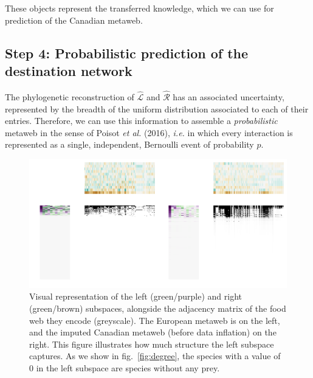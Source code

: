 \documentclass[11pt]{article}
\makeatletter
\def\maxwidth{\ifdim\Gin@nat@width>\linewidth\linewidth
\else\Gin@nat@width\fi}
\let\Oldincludegraphics\includegraphics
\renewcommand{\includegraphics}[1]{\Oldincludegraphics[width=\maxwidth]{#1}}
\providecommand{\DIFaddbeginFL}{} %
\providecommand{\DIFaddendFL}{} %
\providecommand{\DIFdelbeginFL}{} %
\providecommand{\DIFdelendFL}{} %
\newcommand{\DIFscaledelfig}{0.5}
\newlength{\DIFdelgraphicswidth} %
\newlength{\DIFdelgraphicsheight} %
\newcommand{\DIFaddincludegraphics}[2][]{{\color{blue}\fbox{\DIFOincludegraphics[#1]{#2}}}} %
\newcommand{\DIFdelincludegraphics}[2][]{%
\sbox{\DIFdelgraphicsbox}{\DIFOincludegraphics[#1]{#2}}%
\settoboxwidth{\DIFdelgraphicswidth}{\DIFdelgraphicsbox} %
\settoboxtotalheight{\DIFdelgraphicsheight}{\DIFdelgraphicsbox} %
\scalebox{\DIFscaledelfig}{%
\parbox[b]{\DIFdelgraphicswidth}{\usebox{\DIFdelgraphicsbox}\\[-\baselineskip] \rule{\DIFdelgraphicswidth}{0em}}\llap{\resizebox{\DIFdelgraphicswidth}{\DIFdelgraphicsheight}{%
\setlength{\unitlength}{\DIFdelgraphicswidth}%
\begin{picture}(1,1)%
\thicklines\linethickness{2pt} %
{\color[rgb]{1,0,0}\put(0,0){\framebox(1,1){}}}%
{\color[rgb]{1,0,0}\put(0,0){\line( 1,1){1}}}%
{\color[rgb]{1,0,0}\put(0,1){\line(1,-1){1}}}%
\end{picture}%
}\hspace*{3pt}}} %
} %
\DeclareRobustCommand{\DIFaddbeginFL}{\DIFOaddbeginFL \let\includegraphics\DIFaddincludegraphics} %
\DeclareRobustCommand{\DIFaddendFL}{\DIFOaddendFL \let\includegraphics\DIFOincludegraphics} %
\DeclareRobustCommand{\DIFdelbeginFL}{\DIFOdelbeginFL \let\includegraphics\DIFdelincludegraphics} %
\DeclareRobustCommand{\DIFdelendFL}{\DIFOaddendFL \let\includegraphics\DIFOincludegraphics} %
\makeatother
\begin{document}
These objects represent the transferred knowledge, which we can use for
prediction of the Canadian metaweb.

\hypertarget{step-4-probabilistic-prediction-of-the-destination-network}{%
\subsection{Step 4: Probabilistic prediction of the destination
network}\label{step-4-probabilistic-prediction-of-the-destination-network}}

The phylogenetic reconstruction of \(\hat{\mathscr{L}}\) and
\(\hat{\mathscr{R}}\) has an associated uncertainty, represented by the
breadth of the uniform distribution associated to each of their entries.
Therefore, we can use this information to assemble a
\emph{probabilistic} metaweb in the sense of Poisot \emph{et al.}
(2016), \emph{i.e.} in which every interaction is represented as a
single, independent, Bernoulli event of probability \(p\).

\begin{figure}
\DIFdelbeginFL %
\DIFdelendFL \DIFaddbeginFL \hypertarget{fig:subspaces}{%
\centering
\includegraphics{figures/figure-subspaces.png}
\caption{Visual representation of the left (green/purple) and right
(green/brown) subspaces, alongside the adjacency matrix of the food web
they encode (greyscale). The European metaweb is on the left, and the
imputed Canadian metaweb (before data inflation) on the right. This
figure illustrates how much structure the left subspace captures. As we
show in fig.~\ref{fig:degree}, the species with a value of 0 in the left
subspace are species without any prey.}\label{fig:subspaces}
}
\DIFaddendFL 
\end{figure}
\end{document}
